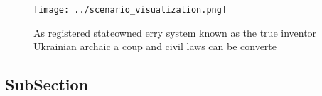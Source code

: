 \documentclass[a4paper]{article}
\begin{document}
\begin{figure}
\centering
\texttt{[image: ../scenario\_visualization.png]}
\caption{As registered stateowned erry system known as the true inventor Ukrainian archaic a coup and civil laws can be converte
}
\end{figure}
 
\subsection{SubSection}
\end{document}
